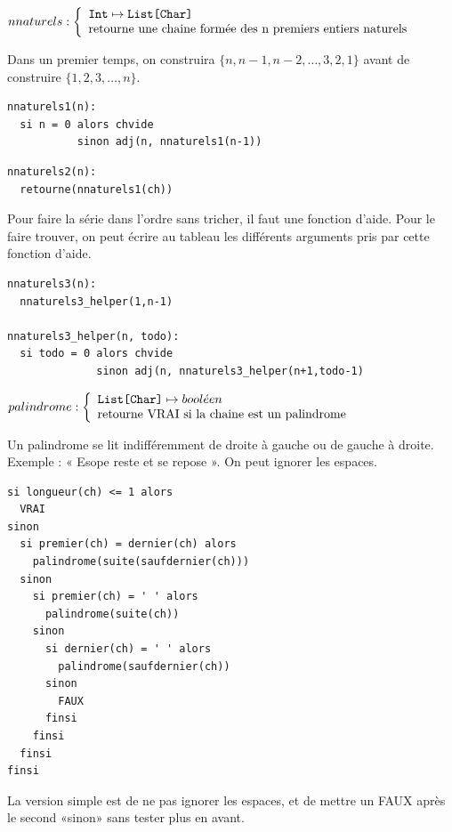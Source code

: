 \documentclass[10pt]{article}\usepackage[correction,nu]{esial}
\begin{document}
\begin{Question}
  $nnaturels: \left\{
    \begin{array}{l}
      \text{\texttt{Int}}\mapsto \text{\texttt{List[Char]}}\\
      \text{retourne une chaine formée des n premiers entiers naturels}
    \end{array}\right.$  
  
  Dans un premier temps, on construira $\{n, n-1, n-2, \ldots, 3, 2, 1\}$ avant
  de construire $\{1, 2, 3, \ldots, n\}$.
\end{Question}
\begin{Reponse}
  \begin{Verbatim}[label=Version simple qui donne la liste à l'envers]
nnaturels1(n):
  si n = 0 alors chvide
           sinon adj(n, nnaturels1(n-1))
  \end{Verbatim}

  \begin{Verbatim}[label=Version trichée qui donne la chaine à l'endroit:]
nnaturels2(n):
  retourne(nnaturels1(ch))
  \end{Verbatim}
  
  Pour faire la série dans l'ordre sans tricher, il faut une fonction
  d'aide. Pour le faire trouver, on peut écrire au tableau les différents
  arguments pris par cette fonction d'aide.
  \begin{Verbatim}[label=Version avec helper:]
nnaturels3(n):
  nnaturels3_helper(1,n-1)    

nnaturels3_helper(n, todo):
  si todo = 0 alors chvide
              sinon adj(n, nnaturels3_helper(n+1,todo-1)
  \end{Verbatim}
\end{Reponse}


\begin{Question}
  $palindrome: \left\{
    \begin{array}{l}
      \text{\texttt{List[Char]}}\mapsto bool\acute{e}en\\
      \text{retourne VRAI si la chaine est un palindrome}
    \end{array}\right.$  

  Un palindrome se lit indifféremment de droite à gauche ou de gauche à droite.
  Exemple : « Esope reste et se repose ». On peut ignorer les espaces.
\end{Question}
\begin{Reponse}
  \begin{Verbatim}[label=palindrome(ch)]
si longueur(ch) <= 1 alors 
  VRAI
sinon
  si premier(ch) = dernier(ch) alors
    palindrome(suite(saufdernier(ch)))
  sinon 
    si premier(ch) = ' ' alors
      palindrome(suite(ch))
    sinon 
      si dernier(ch) = ' ' alors
        palindrome(saufdernier(ch))
      sinon
        FAUX
      finsi
    finsi    
  finsi
finsi    
  \end{Verbatim}
  La version simple est de ne pas ignorer les espaces, et de
  mettre un FAUX après le second «sinon» sans tester plus en avant.
\end{Reponse}
\end{document}

